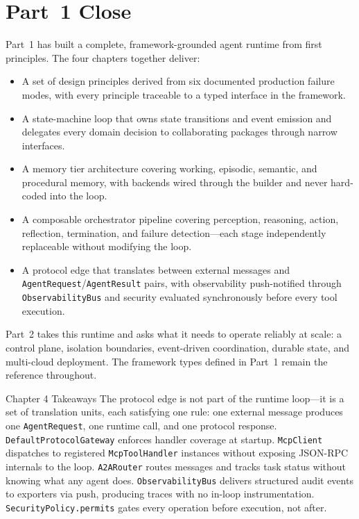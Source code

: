\section{Part~1 Close}
\label{sec:part-close}

Part~1 has built a complete, framework-grounded agent runtime from
first principles.  The four chapters together deliver:

\begin{itemize}
  \item A set of design principles derived from six documented
        production failure modes, with every principle traceable to
        a typed interface in the framework.
  \item A state-machine loop that owns state transitions and event
        emission and delegates every domain decision to collaborating
        packages through narrow interfaces.
  \item A memory tier architecture covering working, episodic,
        semantic, and procedural memory, with backends wired through
        the builder and never hard-coded into the loop.
  \item A composable orchestrator pipeline covering perception,
        reasoning, action, reflection, termination, and failure
        detection---each stage independently replaceable without
        modifying the loop.
  \item A protocol edge that translates between external messages
        and \lstinline{AgentRequest}/\lstinline{AgentResult} pairs,
        with observability push-notified through
        \lstinline{ObservabilityBus} and security evaluated
        synchronously before every tool execution.
\end{itemize}

Part~2 takes this runtime and asks what it needs to operate reliably
at scale: a control plane, isolation boundaries, event-driven
coordination, durable state, and multi-cloud deployment.  The
framework types defined in Part~1 remain the reference throughout.

\begin{takeawaybox}{Chapter 4 Takeaways}
The protocol edge is not part of the runtime loop---it is a set of
translation units, each satisfying one rule: one external message
produces one \lstinline{AgentRequest}, one runtime call, and one
protocol response.  \lstinline{DefaultProtocolGateway} enforces
handler coverage at startup.  \lstinline{McpClient} dispatches to
registered \lstinline{McpToolHandler} instances without exposing
JSON-RPC internals to the loop.  \lstinline{A2ARouter} routes
messages and tracks task status without knowing what any agent does.
\lstinline{ObservabilityBus} delivers structured audit events to
exporters via push, producing traces with no in-loop instrumentation.
\lstinline{SecurityPolicy.permits} gates every operation before
execution, not after.
\end{takeawaybox}

